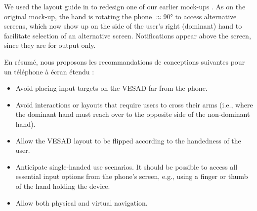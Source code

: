 We used the layout guide in  to redesign one of our earlier mock-ups . As on the original mock-up, the hand is rotating the phone $\approx$\ang{90} to access alternative screens, which now show up on the side of the user's right (dominant) hand to facilitate selection of an alternative screen. Notifications appear above the screen, since they are for output only.

En résumé, nous proposons les recommandations de conceptions suivantes pour un téléphone à écran étendu :
\begin{itemize}
  \item Avoid placing input targets on the VESAD far from the phone.
  \item Avoid interactions or layouts that require users to cross their arms (i.e., where the dominant hand must reach over to the opposite side of the non-dominant hand).
  \item Allow the VESAD layout to be flipped according to the handedness of the user.
  \item Anticipate single-handed use scenarios. It should be possible to access all essential input options from the phone's screen, e.g., using a finger or thumb of the hand holding the device.
  \item Allow both physical and virtual navigation.
\end{itemize}







